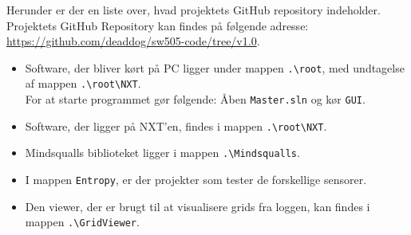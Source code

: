 \label{kildekode}
Herunder er der en liste over, hvad projektets GitHub repository indeholder.
Projektets GitHub Repository kan findes på følgende adresse: \url{https://github.com/deaddog/sw505-code/tree/v1.0}.

\begin{itemize}
\item Software, der bliver kørt på PC ligger under mappen \lstinline[style=c]!.\root!, med undtagelse af mappen \lstinline[style=c]!.\root\NXT!.
\\
For at starte programmet gør følgende:
Åben \lstinline[style=c]!Master.sln! og kør \lstinline[style=c]!GUI!.
\item Software, der ligger på NXT'en, findes i mappen \lstinline[style=c]!.\root\NXT!.
\item Mindsqualls biblioteket ligger i mappen \lstinline[style=c]!.\Mindsqualls!.
\item I mappen \lstinline[style=c]!Entropy!, er der projekter som tester de forskellige sensorer.
\item Den viewer, der er brugt til at visualisere grids fra loggen, kan findes i mappen \lstinline[style=c]!.\GridViewer!.

\end{itemize}